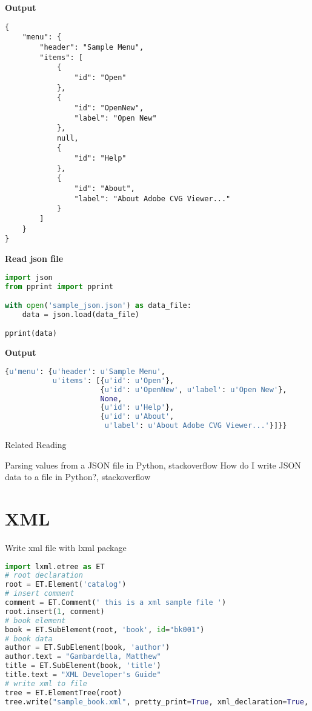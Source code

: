 \textbf{Output}

\begin{lstlisting}
{
    "menu": {
        "header": "Sample Menu",
        "items": [
            {
                "id": "Open"
            },
            {
                "id": "OpenNew",
                "label": "Open New"
            },
            null,
            {
                "id": "Help"
            },
            {
                "id": "About",
                "label": "About Adobe CVG Viewer..."
            }
        ]
    }
}
\end{lstlisting}

\textbf{Read json file}

\begin{lstlisting}[language=Python]
import json
from pprint import pprint

with open('sample_json.json') as data_file:
    data = json.load(data_file)

pprint(data)
\end{lstlisting}


\textbf{Output}

\begin{lstlisting}[language=Python]
{u'menu': {u'header': u'Sample Menu',
           u'items': [{u'id': u'Open'},
                      {u'id': u'OpenNew', u'label': u'Open New'},
                      None,
                      {u'id': u'Help'},
                      {u'id': u'About',
                       u'label': u'About Adobe CVG Viewer...'}]}}
\end{lstlisting}

Related Reading

Parsing values from a JSON file in Python, stackoverflow
How do I write JSON data to a file in Python?, stackoverflow

\section{XML}

Write xml file with lxml package

\begin{lstlisting}[language=Python]
import lxml.etree as ET
# root declaration
root = ET.Element('catalog')
# insert comment
comment = ET.Comment(' this is a xml sample file ')
root.insert(1, comment)
# book element
book = ET.SubElement(root, 'book', id="bk001")
# book data
author = ET.SubElement(book, 'author')
author.text = "Gambardella, Matthew"
title = ET.SubElement(book, 'title')
title.text = "XML Developer's Guide"
# write xml to file
tree = ET.ElementTree(root)
tree.write("sample_book.xml", pretty_print=True, xml_declaration=True, encoding='utf-8')
\end{lstlisting}

